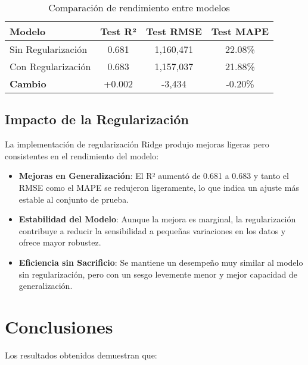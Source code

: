 \documentclass[11pt,a4paper]{article}
\begin{document}
\begin{table}[H]
    \centering
    \begin{tabular}{|l|c|c|c|}
    \hline
    \textbf{Modelo} & \textbf{Test R²} & \textbf{Test RMSE} & \textbf{Test MAPE} \\
    \hline
    Sin Regularización & 0.681 & 1,160,471 & 22.08\% \\
    Con Regularización & 0.683 & 1,157,037 & 21.88\% \\
    \hline
    \textbf{Cambio} & +0.002 & -3,434 & -0.20\% \\
    \hline
    \end{tabular}
    \caption{Comparación de rendimiento entre modelos}
    \label{tab:model_comparison}
\end{table}

\subsection{Impacto de la Regularización}

La implementación de regularización Ridge produjo mejoras ligeras pero consistentes en el rendimiento del modelo:

\begin{itemize}
    \item \textbf{Mejoras en Generalización}: El R² aumentó de 0.681 a 0.683 y tanto el RMSE como el MAPE se redujeron ligeramente, lo que indica un ajuste más estable al conjunto de prueba.
    \item \textbf{Estabilidad del Modelo}: Aunque la mejora es marginal, la regularización contribuye a reducir la sensibilidad a pequeñas variaciones en los datos y ofrece mayor robustez.
    \item \textbf{Eficiencia sin Sacrificio}: Se mantiene un desempeño muy similar al modelo sin regularización, pero con un sesgo levemente menor y mejor capacidad de generalización.
\end{itemize}


\section{Conclusiones}

Los resultados obtenidos demuestran que:
\end{document}
